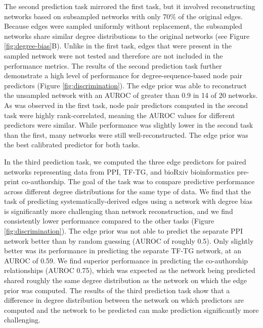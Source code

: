 The second prediction task mirrored the first task, but it involved reconstructing networks based on subsampled networks with only 70\% of the original edges.
Because edges were sampled uniformly without replacement, the subsampled networks share similar degree distributions to the original networks (see Figure \ref{fig:degree-bias}B).
Unlike in the first task, edges that were present in the sampled network were not tested and therefore are not included in the performance metrics.
The results of the second prediction task further demonstrate a high level of performance for degree-sequence-based node pair predictors (Figure \ref{fig:discrimination}).
The edge prior was able to reconstruct the unsampled network with an AUROC of greater than 0.9 in 14 of 20 networks.
As was observed in the first task, node pair predictors computed in the second task were highly rank-correlated, meaning the AUROC values for different predictors were similar.
While performance was slightly lower in the second task than the first, many networks were still well-reconstructed.
The edge prior was the best calibrated predictor for both tasks.

In the third prediction task, we computed the three edge predictors for paired networks representing data from PPI, TF-TG, and bioRxiv bioinformatics pre-print co-authorship.
The goal of the task was to compare predictive performance across different degree distributions for the same type of data.
We find that the task of predicting systematically-derived edges using a network with degree bias is significantly more challenging than network reconstruction, and we find consistently lower performance compared to the other tasks (Figure \ref{fig:discrimination}).
The edge prior was not able to predict the separate PPI network better than by random guessing (AUROC of roughly 0.5).
Only slightly better was its performance in predicting the separate TF-TG network, at an AUROC of 0.59.
We find superior performance in predicting the co-authorship relationships (AUROC 0.75), which was expected as the network being predicted shared roughly the same degree distribution as the network on which the edge prior was computed.
The results of the third prediction task show that a difference in degree distribution between the network on which predictors are computed and the network to be predicted can make prediction significantly more challenging.

